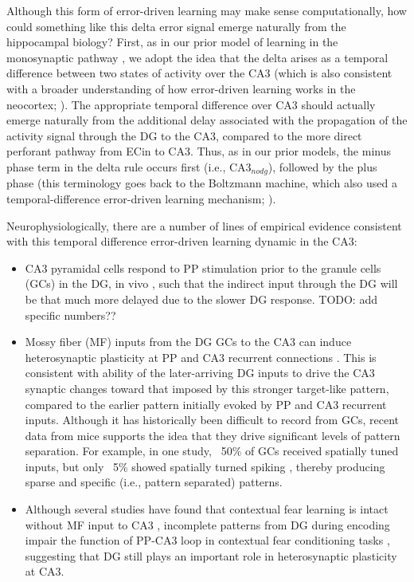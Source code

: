 \documentclass[11pt,twoside]{article}
\newif\myifpdf
\begin{document}
Although this form of error-driven learning may make sense computationally, how could something like this delta error signal emerge naturally from the hippocampal biology?  First, as in our prior model of learning in the monosynaptic pathway \citep{KetzMorkondaOReilly13}, we adopt the idea that the delta arises as a temporal difference between two states of activity over the CA3 (which is also consistent with a broader understanding of how error-driven learning works in the neocortex; \citep{OReilly96,OReillyMunakata00,OReillyRussinZolfagharEtAl21}). The appropriate temporal difference over CA3 should actually emerge naturally from the additional delay associated with the propagation of the activity signal through the DG to the CA3, compared to the more direct perforant pathway from ECin to CA3.  Thus, as in our prior models, the minus phase term in the delta rule occurs first (i.e., $\mbox{CA3}_{nodg}$), followed by the plus phase (this terminology goes back to the Boltzmann machine, which also used a temporal-difference error-driven learning mechanism; \citealp{AckleyHintonSejnowski85}).

Neurophysiologically, there are a number of lines of empirical evidence consistent with this temporal difference error-driven learning dynamic in the CA3:
\begin{itemize}

	\item CA3 pyramidal cells respond to PP stimulation prior to the granule cells (GCs) in the DG, in vivo \citep{YeckelBerger90,DoMartinezMartinezEtAl02}, such that the indirect input through the DG will be that much more delayed due to the slower DG response. TODO: add specific numbers??

\item Mossy fiber (MF) inputs from the DG GCs to the CA3 can induce heterosynaptic plasticity at PP and CA3 recurrent connections \citep{McMahonBarrionuevo02,TsukamotoYasuiYamadaEtAl03,KobayashiPoo04,RebolaCartaMulle17}. This is consistent with ability of the later-arriving DG inputs to drive the CA3 synaptic changes toward that imposed by this stronger target-like pattern, compared to the earlier pattern initially evoked by PP and CA3 recurrent inputs.
Although it has historically been difficult to record from GCs, recent data from mice supports the idea that they drive significant levels of pattern separation.  For example, in one study, ~50\% of GCs received spatially tuned inputs, but only ~5\% showed spatially turned spiking \citep{ZhangSchloglJonas20}, thereby producing sparse and specific (i.e., pattern separated) patterns.

\item Although several studies have found that contextual fear learning is intact without MF input to CA3 \citep{McHughJonesQuinnEtAl07,NakashibaCushmanPelkeyEtAl12,KitamuraSunMartinEtAl15}, incomplete patterns from DG during encoding impair the function of PP-CA3 loop in contextual fear conditioning tasks \citep{BernierLacagninaAyoubEtAl17}, suggesting that DG still plays an important role in heterosynaptic plasticity at CA3.
\end{itemize}
\end{document}
